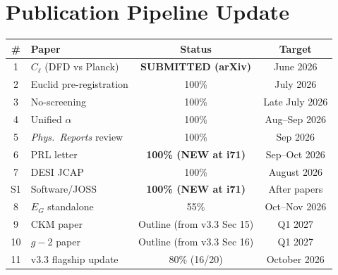 \documentclass[11pt,a4paper]{article}
\begin{document}
\section{Publication Pipeline Update}

\begin{center}
\begin{tabular}{clcc}
\toprule
\textbf{\#} & \textbf{Paper} & \textbf{Status} & \textbf{Target} \\
\midrule
1 & $C_\ell$ (DFD vs Planck) & \textbf{SUBMITTED (arXiv)} & June 2026 \\
2 & Euclid pre-registration & 100\% & July 2026 \\
3 & No-screening & 100\% & Late July 2026 \\
4 & Unified $\alpha$ & 100\% & Aug--Sep 2026 \\
5 & \textit{Phys.\ Reports} review & 100\% & Sep 2026 \\
6 & PRL letter & \textbf{100\% (NEW at i71)} & Sep--Oct 2026 \\
7 & DESI JCAP & 100\% & August 2026 \\
\midrule
S1 & Software/JOSS & \textbf{100\% (NEW at i71)} & After papers \\
\midrule
8 & $E_G$ standalone & 55\% & Oct--Nov 2026 \\
9 & CKM paper & Outline (from v3.3 Sec 15) & Q1 2027 \\
10 & $g-2$ paper & Outline (from v3.3 Sec 16) & Q1 2027 \\
11 & v3.3 flagship update & 80\% (16/20) & October 2026 \\
\bottomrule
\end{tabular}
\end{center}
\end{document}
